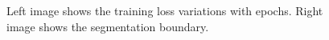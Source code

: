 \documentclass[a4paper]{article}
\begin{document}
  \begin{figure}[thpb]
	\setlength{\fboxrule}{0.0pt}      
	\caption{Left image shows the training loss variations with epochs. Right image shows the segmentation boundary.}
\end{figure}
\end{document}
